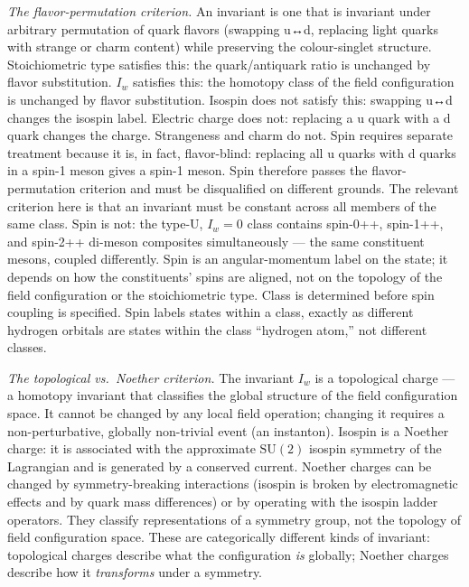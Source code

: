 \emph{The flavor-permutation criterion.} An invariant is one
that is invariant under arbitrary permutation of quark flavors (swapping
u↔d, replacing light quarks with strange or charm content) while
preserving the colour-singlet structure. Stoichiometric type satisfies
this: the quark/antiquark ratio is unchanged by flavor substitution.
\(I_w\) satisfies this: the homotopy class of the field configuration is
unchanged by flavor substitution. Isospin does not satisfy this:
swapping u↔d changes the isospin label. Electric charge does not:
replacing a u quark with a d quark changes the charge. Strangeness and
charm do not. Spin requires separate treatment because it is, in fact,
flavor-blind: replacing all u quarks with d quarks in a spin-1 meson
gives a spin-1 meson. Spin therefore passes the flavor-permutation
criterion and must be disqualified on different grounds. The relevant
criterion here is that an invariant must be constant across
all members of the same class. Spin is not: the type-U,
\(I_w = 0\) class contains spin-0++, spin-1++, and spin-2++
di-meson composites simultaneously --- the same constituent mesons,
coupled differently. Spin is an angular-momentum label on the state; it
depends on how the constituents' spins are aligned, not on the topology
of the field configuration or the stoichiometric type. Class
is determined before spin coupling is specified. Spin labels states
within a class, exactly as different hydrogen orbitals are states within
the class ``hydrogen atom,'' not different classes.

\emph{The topological vs.~Noether criterion.} The invariant \(I_w\) is a
topological charge --- a homotopy invariant that classifies the global
structure of the field configuration space. It cannot be changed by any
local field operation; changing it requires a non-perturbative, globally
non-trivial event (an instanton). Isospin is a Noether charge: it is
associated with the approximate \(\mathrm{SU}(2)\) isospin symmetry of
the Lagrangian and is generated by a conserved current. Noether charges
can be changed by symmetry-breaking interactions (isospin is broken by
electromagnetic effects and by quark mass differences) or by operating
with the isospin ladder operators. They classify representations of a
symmetry group, not the topology of field configuration space. These are
categorically different kinds of invariant: topological charges describe
what the configuration \emph{is} globally; Noether charges describe how
it \emph{transforms} under a symmetry.

